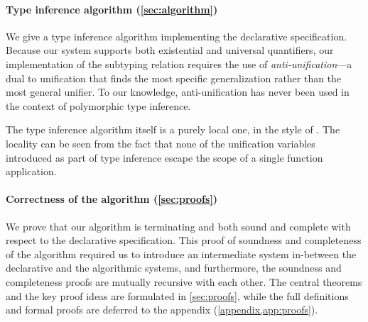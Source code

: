 \paragraph*{Type inference algorithm (\cref{sec:algorithm})} 
  We give a type inference algorithm implementing the declarative specification.
  Because our system supports both existential and universal quantifiers, our
  implementation of the subtyping relation requires the use of
  \emph{anti-unification}---a dual to unification that finds the most specific
  generalization rather than the most general unifier. To our knowledge,
  anti-unification has never been used in the context of polymorphic type
  inference.

  The type inference algorithm itself is a purely local one, in the style of
  \citet{pierce2000:local}. The locality can be seen from the fact that 
  none of the unification variables introduced as part of type inference
  escape the scope of a single function application.

\paragraph*{Correctness of the algorithm (\cref{sec:proofs})}
  We prove that our algorithm is terminating and both sound and complete with
  respect to the declarative specification. This proof of soundness and completeness
  of the algorithm required us to introduce an intermediate system in-between
  the declarative and the algorithmic systems, and furthermore, the
  soundness and completeness proofs are mutually recursive with each other.
  The central theorems and the key proof ideas are formulated in \cref{sec:proofs}, 
  while the full definitions and formal proofs are deferred to the appendix (\cref{appendix,app:proofs}).

  

